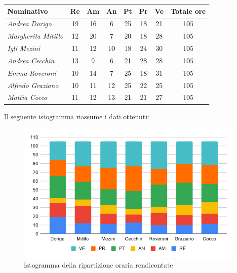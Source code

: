 {{{{{{{{{{{{{	\begin{center}
		\renewcommand{\arraystretch}{1.4}
		\begin{tabularx}{\textwidth}{|X|c|c|c|c|c|c|c|}
			\hline
			\rowcolor{airforceblue}
			\textbf{Nominativo} & \textbf{Re} & \textbf{Am} & \textbf{An} & \textbf{Pt} & \textbf{Pr} & \textbf{Ve} & \textbf{Totale ore}\\
			\hline
			\textit{Andrea Dorigo} & 19 & 16 & 6 & 25 & 18 & 21 & 105\\
			\hline
			\textit{Margherita Mitillo} & 12 & 20 & 7 & 20 & 18 & 28 & 105\\
			\hline
			\textit{Igli Mezini} & 11 & 12 & 10 & 18 & 24 & 30 & 105\\
			\hline
			\textit{Andrea Cecchin} & 13 & 9 & 6 & 21 & 28 & 28 & 105\\
			\hline
			\textit{Emma Roveroni} & 10 & 14 & 7 & 25 & 18 & 31 & 105\\
			\hline
			\textit{Alfredo Graziano} & 10 & 11 & 12 & 25 & 22 & 25 & 105\\
			\hline
			\textit{Mattia Cocco} & 11 & 12 & 13 & 21 & 21 & 27 & 105\\
			\hline
		\end{tabularx}
	\end{center}
Il seguente istogramma riassume i dati ottenuti:
\begin{figure}[!ht]
	\begin{center}
		\includegraphics[width=0.8\linewidth]{../immagini/pdp/istogramma_rendicontate.png}
		\caption{Istogramma della ripartizione oraria rendicontate}
	\end{center}
\end{figure}

}}}}}}}}}}}}}
